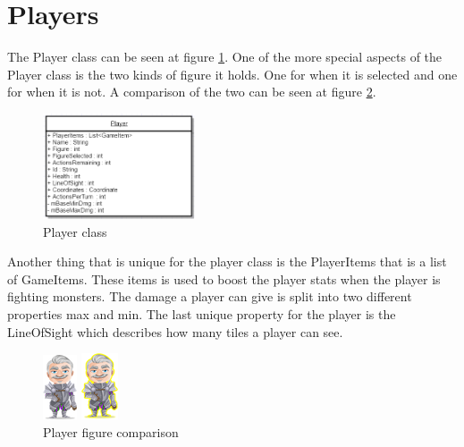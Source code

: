 \section{Players}

The Player class can be seen at figure \ref{fig:Player class}. One of the more special aspects of the Player class is the two kinds of figure it holds. One for when it is selected and one for when it is not. A comparison of the two can be seen at figure \ref{fig:PlayerFigure}.\\

\begin{figure}
	\centering
	\includegraphics[width=0.4\textwidth]{images/ClassPlayer.png}
	\caption{Player class}
	\label{fig:Player class}
\end{figure}

Another thing that is unique for the player class is the PlayerItems that is a list of GameItems. These items is used to boost the player stats when the player is fighting monsters. The damage a player can give is split into two different properties max and min. The last unique property for the player is the LineOfSight which describes how many tiles a player can see. 

\begin{figure}
		\centering
	\begin{minipage}{0.48\textwidth}
		\includegraphics{images/player_old_man.png}
		\raggedleft
	\end{minipage}
	\begin{minipage}{0.48\textwidth}
		\includegraphics{images/player_old_man_selected.png}
	\end{minipage}
		\caption{Player figure comparison}
	\label{fig:PlayerFigure}
\end{figure}

